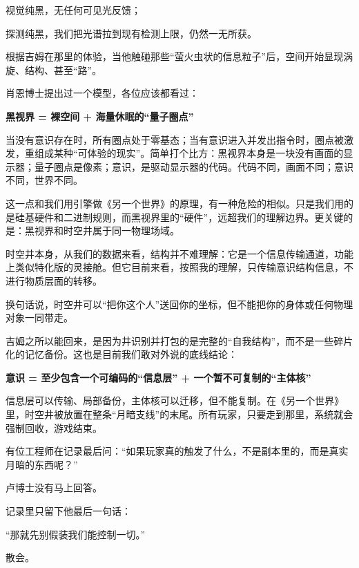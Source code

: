 视觉纯黑，无任何可见光反馈；

探测纯黑，我们把光谱拉到现有检测上限，仍然一无所获。

根据吉姆在那里的体验，当他触碰那些“萤火虫状的信息粒子”后，空间开始显现涡旋、结构、甚至“路”。

肖恩博士提出过一个模型，各位应该都看过：

\begin{center}
\textbf{黑视界 = 裸空间 + 海量休眠的“量子圈点”}
\end{center}

当没有意识存在时，所有圈点处于零基态；当有意识进入并发出指令时，圈点被激发，重组成某种“可体验的现实”。简单打个比方：黑视界本身是一块没有画面的显示器；量子圈点是像素；意识，是驱动显示器的代码。代码不同，画面不同；意识不同，世界不同。

这一点和我们用引擎做《另一个世界》的原理，有一种危险的相似。只是我们用的是硅基硬件和二进制规则，而黑视界里的“硬件”，远超我们的理解边界。更关键的是：黑视界和时空井属于同一物理场域。

时空井本身，从我们的数据来看，结构并不难理解：它是一个信息传输通道，功能上类似特化版的灵接舱。但它目前来看，按照我的理解，只传输意识结构信息，不进行物质层面的转移。

换句话说，时空井可以“把你这个人”送回你的坐标，但不能把你的身体或任何物理对象一同带走。

吉姆之所以能回来，是因为井识别并打包的是完整的“自我结构”，而不是一些碎片化的记忆备份。这也是目前我们敢对外说的底线结论：

\begin{center}
\textbf{意识 = 至少包含一个可编码的“信息层” + 一个暂不可复制的“主体核”}
\end{center}

信息层可以传输、局部备份，主体核可以迁移，但不能复制。在《另一个世界》里，时空井被放置在整条“月暗支线”的末尾。所有玩家，只要走到那里，系统就会强制回收，游戏结束。

有位工程师在记录最后问：“如果玩家真的触发了什么，不是副本里的，而是真实月暗的东西呢？”

卢博士没有马上回答。

记录里只留下他最后一句话：

“那就先别假装我们能控制一切。”

散会。
